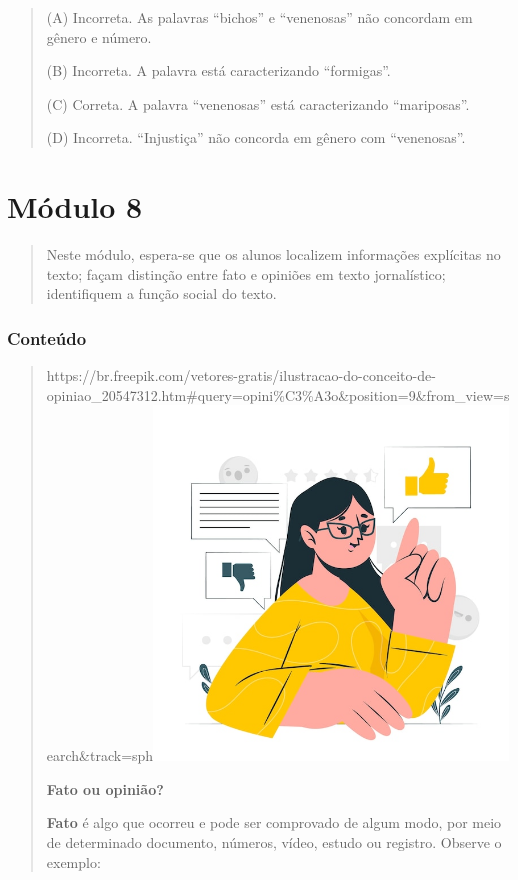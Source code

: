\begin{itemize}
{{{\begin{itemize}
\begin{itemize}
\begin{itemize}
\begin{quote}
(A) Incorreta. As palavras ``bichos'' e ``venenosas'' não concordam em
gênero e número.

(B) Incorreta. A palavra está caracterizando ``formigas''.

(C) Correta. A palavra ``venenosas'' está caracterizando ``mariposas''.

(D) Incorreta. ``Injustiça'' não concorda em gênero com ``venenosas''.
\end{quote}

\chapter{Módulo 8}

\begin{quote}
Neste módulo, espera-se que os alunos localizem informações explícitas
no texto; façam distinção entre fato e opiniões em texto jornalístico;
identifiquem a função social do texto.
\end{quote}

\subsection{Conteúdo}\label{conteuxfado-7}

\begin{quote}
https://br.freepik.com/vetores-gratis/ilustracao-do-conceito-de-opiniao\_20547312.htm\#query=opini\%C3\%A3o\&position=9\&from\_view=search\&track=sph\includegraphics[width=3.70764in,height=3.70764in]{media/image25.jpeg}

\textbf{Fato ou opinião?}

\textbf{Fato} é algo que ocorreu e pode ser comprovado de algum modo,
por meio de determinado documento, números, vídeo, estudo ou registro.
Observe o exemplo:
\end{quote}


\end{itemize}
\end{itemize}
\end{itemize}}}}
\end{itemize}
